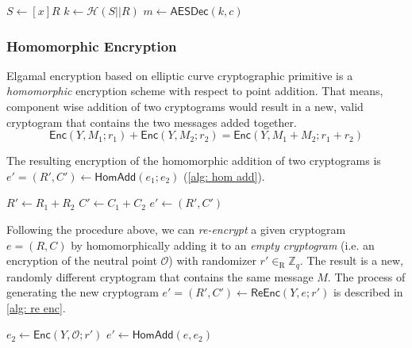 \begin{algorithm}[ht]
    \DontPrintSemicolon
    \caption{$\mathsf{TxtDec} (x, e)$}
    
    $S \gets [x]R$ \;
    $k \gets \mathcal{H} (S || R)$ \;
    $m \gets \mathsf{AESDec} (k, c)$ \;
     
    
    \label{alg: txt dec}
\end{algorithm}


\subsubsection{Homomorphic Encryption}
Elgamal encryption based on elliptic curve cryptographic primitive is a \textit{homomorphic} encryption scheme with respect to point addition. That means, component wise addition of two cryptograms would result in a new, valid cryptogram that contains the two messages added together.
\[
\mathsf{Enc}(Y, M_1; r_1) + \mathsf{Enc}(Y, M_2; r_2) = \mathsf{Enc}(Y, M_1 + M_2; r_1 + r_2)
\]

The resulting encryption of the homomorphic addition of two cryptograms is $e' = (R', C') \gets \mathsf{HomAdd} (e_1; e_2)$ (\cref{alg: hom add}).

\begin{algorithm}[ht]
    \DontPrintSemicolon
    \caption{$\mathsf{HomAdd}(e_1; e_2)$}
    
    $R' \gets R_1 + R_2$ \;
    $C' \gets C_1 + C_2$ \;
    $e' \gets (R', C')$\;
     
    
    \label{alg: hom add}
\end{algorithm}

Following the procedure above, we can \textit{re-encrypt} a given cryptogram $e = (R, C)$ by homomorphically adding it to an \textit{empty cryptogram} (i.e. an encryption of the neutral point $\mathcal{O}$) with randomizer $r' \in_\mathrm{R} \mathbb{Z}_q$. The result is a new, randomly different cryptogram that contains the same message $M$. The process of generating the new cryptogram $e' = (R', C') \gets \mathsf{ReEnc} (Y, e; r')$ is described in \cref{alg: re enc}.

\begin{algorithm}[ht]
    \DontPrintSemicolon
    \caption{$\mathsf{ReEnc} (Y, e; r')$}
    
    $e_2 \gets \mathsf{Enc}(Y, \mathcal{O}; r')$ 
    $e' \gets \mathsf{HomAdd} (e, e_2)$ 
     
    
    \label{alg: re enc}
\end{algorithm}

